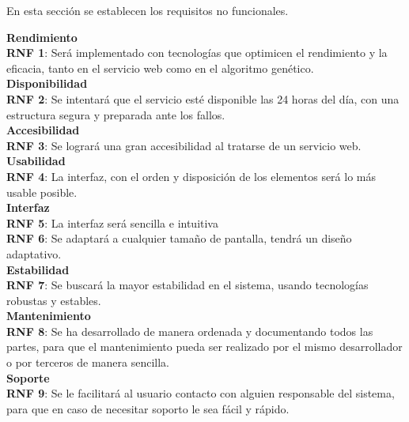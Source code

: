 \bigskip
En esta sección se establecen los requisitos no funcionales.

\bigskip
\textbf{Rendimiento}\\

\textbf{RNF 1}: Será implementado con tecnologías que optimicen el rendimiento y la eficacia, tanto en el servicio web como en el algoritmo genético.\\

\textbf{Disponibilidad}\\

\textbf{RNF 2}: Se intentará que el servicio esté disponible las 24 horas del día, con una estructura segura y preparada ante los fallos.\\


\textbf{Accesibilidad}\\

\textbf{RNF 3}: Se logrará una gran accesibilidad al tratarse de un servicio web.\\


\textbf{Usabilidad}\\

\textbf{RNF 4}: La interfaz, con el orden y disposición de los elementos será lo más usable posible.\\

\textbf{Interfaz}\\

\textbf{RNF 5}: La interfaz será sencilla e intuitiva\\

\textbf{RNF 6}: Se adaptará a cualquier tamaño de pantalla, tendrá un diseño adaptativo.\\


\textbf{Estabilidad}\\

\textbf{RNF 7}: Se buscará la mayor estabilidad en el sistema, usando tecnologías robustas y estables.\\


\textbf{Mantenimiento}\\

\textbf{RNF 8}: Se ha desarrollado de manera ordenada y documentando todos las partes, para que el mantenimiento pueda ser realizado por el mismo desarrollador o por terceros de manera sencilla.\\


\textbf{Soporte}\\

\textbf{RNF 9}: Se le facilitará al usuario contacto con alguien responsable del sistema, para que en caso de necesitar soporto le sea fácil y rápido.\\



